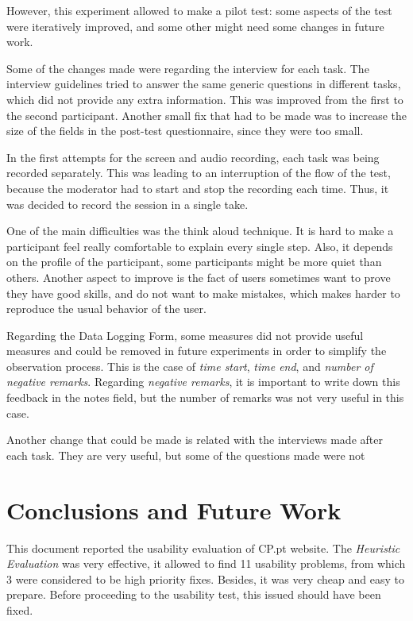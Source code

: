 \documentclass[a4paper]{article}
\begin{document}
However, this experiment allowed to make a pilot test: some aspects of the test were iteratively improved, and some other might need some changes in future work.

Some of the changes made were regarding the interview for each task. The interview guidelines tried to answer the same generic questions in different tasks, which did not provide any extra information. This was improved from the first to the second participant.
Another small fix that had to be made was to increase the size of the fields in the post-test questionnaire, since they were too small.

In the first attempts for the screen and audio recording, each task was being recorded separately. This was leading to an interruption of the flow of the test, because the moderator had to start and stop the recording each time. Thus, it was decided to record the session in a single take.

One of the main difficulties was the think aloud technique. It is hard to make a participant feel really comfortable to explain every single step. Also, it depends on the profile of the participant, some participants might be more quiet than others. Another aspect to improve is the fact of users sometimes want to prove they have good skills, and do not want to make mistakes, which makes harder to reproduce the usual behavior of the user.

Regarding the Data Logging Form, some measures did not provide useful measures and could be removed in future experiments in order to simplify the observation process. This is the case of \emph{time start}, \emph{time end}, and \emph{number of negative remarks}. Regarding \emph{negative remarks}, it is important to write down this feedback in the notes field, but the number of remarks was not very useful in this case.

Another change that could be made is related with the interviews made after each task. They are very useful, but some of the questions made were not




\section{Conclusions and Future Work}

This document reported the usability evaluation of CP.pt website. The \emph{Heuristic Evaluation} was very effective, it allowed to find 11 usability problems, from which 3 were considered to be high priority fixes. Besides, it was very cheap and easy to prepare. Before proceeding to the usability test, this issued should have been fixed.
\end{document}
